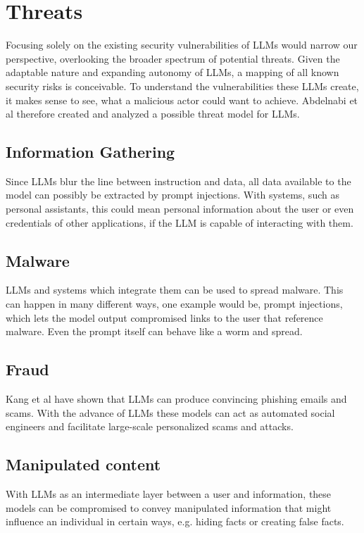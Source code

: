 \documentclass{SeminarV2}
\begin{document}
\section{Threats}
Focusing solely on the existing security vulnerabilities of LLMs would narrow our perspective, overlooking the broader spectrum of potential threats. Given the adaptable nature and expanding autonomy of LLMs, a mapping of all known security risks is conceivable. To understand the vulnerabilities these LLMs create, it makes sense to see, what a malicious actor could want to achieve. Abdelnabi et al \cite{abdelnabi2023not} therefore created and analyzed a possible threat model for LLMs.

\subsection{Information Gathering}
Since LLMs blur the line between instruction and data, all data available to the model can possibly be extracted by prompt injections. With systems, such as personal assistants, this could mean personal information about the user or even credentials of other applications, if the LLM is capable of interacting with them. 
\subsection{Malware}
LLMs and systems which integrate them can be used to spread malware. This can happen in many different ways, one example would be, prompt injections, which lets the model output compromised links to the user that reference malware. Even the prompt itself can behave like a worm and spread.
\subsection{Fraud} 
Kang et al \cite{kang2023exploiting} have shown that LLMs can produce convincing phishing emails and scams. With the advance of LLMs these models can act as automated social engineers and facilitate large-scale personalized scams and attacks.

\subsection{Manipulated content}
With LLMs as an intermediate layer between a user and information, these models can be compromised to convey manipulated information that might influence an individual in certain ways, e.g. hiding facts or creating false facts.
\end{document}
